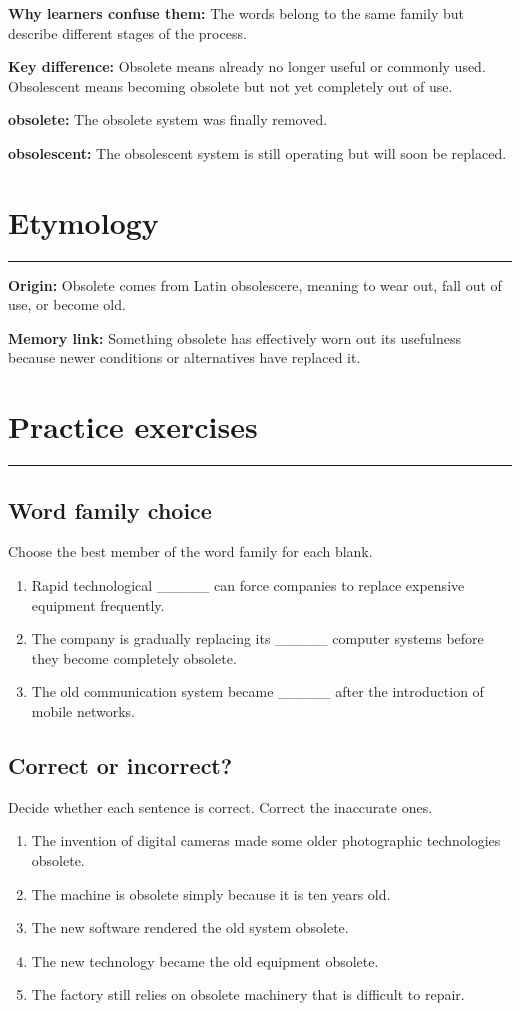 \documentclass[11pt]{article}
\newcommand{\sectionrule}{\par\vspace{-0.5em}\noindent\textcolor{Accent}{\rule{\linewidth}{0.6pt}}\par}
\begin{document}
\textbf{Why learners confuse them:} The words belong to the same family but describe different stages of the process.

\textbf{Key difference:} Obsolete means already no longer useful or commonly used. Obsolescent means becoming obsolete but not yet completely out of use.

\textbf{obsolete:} The obsolete system was finally removed.

\textbf{obsolescent:} The obsolescent system is still operating but will soon be replaced.

\section{Etymology}
\sectionrule
\textbf{Origin:} Obsolete comes from Latin obsolescere, meaning to wear out, fall out of use, or become old.

\textbf{Memory link:} Something obsolete has effectively worn out its usefulness because newer conditions or alternatives have replaced it.

\section{Practice exercises}
\sectionrule
\subsection{Word family choice}
Choose the best member of the word family for each blank.

\begin{enumerate}
  \item Rapid technological \_\_\_\_\_ can force companies to replace expensive equipment frequently.
  \item The company is gradually replacing its \_\_\_\_\_ computer systems before they become completely obsolete.
  \item The old communication system became \_\_\_\_\_ after the introduction of mobile networks.
\end{enumerate}

\subsection{Correct or incorrect?}
Decide whether each sentence is correct. Correct the inaccurate ones.

\begin{enumerate}
  \item The invention of digital cameras made some older photographic technologies obsolete.
  \item The machine is obsolete simply because it is ten years old.
  \item The new software rendered the old system obsolete.
  \item The new technology became the old equipment obsolete.
  \item The factory still relies on obsolete machinery that is difficult to repair.
\end{enumerate}
\end{document}

